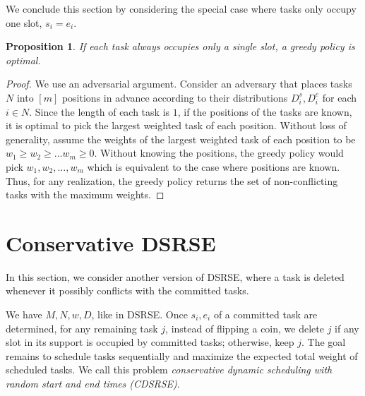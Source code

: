 \documentclass[final,5p,times,twocolumn]{elsarticle}
\newtheorem{proposition}[theorem]{Proposition}
\begin{document}
We conclude this section by considering the special case where tasks only occupy one slot, $ s_i = e_i $.
\begin{proposition}
    If each task always occupies only a single slot, a greedy policy is optimal.
\end{proposition}
\begin{proof}
    We use an adversarial argument.
    Consider an adversary that places tasks $N$ into $[m]$ positions in advance according to their distributions $D_i^s,D_i^e$ for each $i\in N$.
    Since the length of each task is $1$, if the positions of the tasks are known, it is optimal to pick the largest weighted task of each position.
    Without loss of generality, assume the weights of the largest weighted task of each position to be $w_1\geq w_2\geq \ldots w_m\geq 0$.
    Without knowing the positions, the greedy policy would pick $w_1,w_2,\ldots, w_m$ which is equivalent to the case where positions are known.
    Thus, for any realization, the greedy policy returns the set of non-conflicting tasks with the maximum weights.
\end{proof}
\section{Conservative DSRSE}
In this section, we consider another version of DSRSE, where a task is deleted whenever it possibly conflicts with the committed tasks.

We have $M,N,w,D$, like in DSRSE. 
Once $s_i,e_i$ of a committed task are determined, for any remaining task $j$, instead of flipping a coin, we delete $j$ if any slot in its support is occupied by committed tasks; otherwise, keep $j$.
The goal remains to schedule tasks sequentially and maximize the expected total weight of scheduled tasks.
We call this problem \emph{conservative dynamic scheduling with random start and end times (CDSRSE)}.
\end{document}
